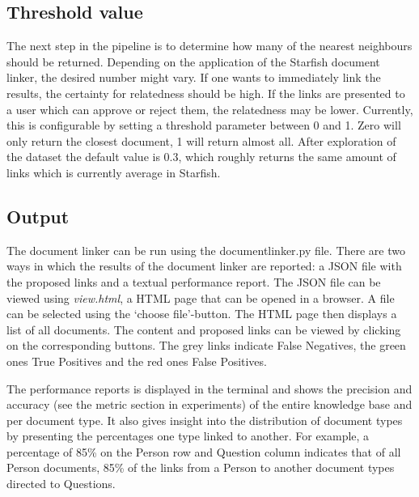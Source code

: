 \subsection{Threshold value}
The next step in the pipeline is to determine how many of the nearest neighbours should be returned. Depending on the application of the Starfish document linker, the desired number might vary. If one wants to immediately link the results, the certainty for relatedness should be high. If the links are presented to a user which can approve or reject them, the relatedness may be lower. Currently, this is configurable by setting a threshold parameter between 0 and 1. Zero will only return the closest document, 1 will return almost all. After exploration of the dataset the default value is 0.3, which roughly returns the same amount of links which is currently average in Starfish.

\subsection{Output}
The document linker can be run using the documentlinker.py file. There are two ways in which the results of the document linker are reported: a JSON file with the proposed links and a textual performance report. The JSON file can be viewed using \emph{view.html}, a HTML page that can be opened in a browser. A file can be selected using the `choose file'-button. The HTML page then displays a list of all documents. The content and proposed links can be viewed by clicking on the corresponding buttons. The grey links indicate False Negatives, the green ones True Positives and the red ones False Positives. 

The performance reports is displayed in the terminal and shows the precision and accuracy (see the metric section in experiments) of the entire knowledge base and per document type. It also gives insight into the distribution of document types by presenting the percentages one type linked to another. For example, a percentage of 85\% on the Person row and Question column indicates that of all Person documents, 85\% of the links from a Person to another document types directed to Questions. 
